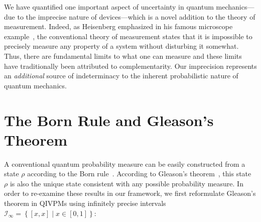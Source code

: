 \documentclass[english,reprint, aps, prl,superscriptaddress, showpacs,
showkeys, longbibliography, amsmath, amssymb, floatfix]{revtex4-1}
\theoremstyle{plain}
\theoremstyle{definition}
\newcommand{\set}[2]{\ensuremath{\left\{ {#1}\mathrel{}\middle|\mathrel{}{#2}\right\} }}
\begin{document}
We have quantified one important aspect of uncertainty in quantum
mechanics---due to the imprecise nature of devices---which is a novel
addition to the theory of measurement. Indeed, as Heisenberg
emphasized in his famous microscope
example~\cite{Heisenberg1983apsrev4}, the conventional theory
of measurement states that it is impossible to precisely measure any
property of a system without disturbing it somewhat. Thus, there are
fundamental limits to what one can measure and these limits have traditionally 
been attributed to complementarity. Our imprecision represents an 
\emph{additional} source of indeterminacy to the inherent probabilistic nature
of quantum mechanics.





\section{The Born Rule and Gleason's Theorem}

\label{sec:Gleason}

A conventional quantum probability measure can be easily constructed
from a state $\rho$ according to the Born
rule~\citep{Born1983bibTeX,Mermin2007,Jaeger2007}.  According
to Gleason's
theorem~\citep{gleason1957,Redhead1987-REDINA,peres1995quantum}, this
state $\rho$ is also the unique state consistent with any possible
probability measure. In order to re-examine these results in our
framework, we first reformulate Gleason's theorem in QIVPMs using
infinitely precise
intervals~$\mathscr{I}_{\infty}=\set{\left[x,x\right]}{x\in\left[0,1\right]}$:
\end{document}
